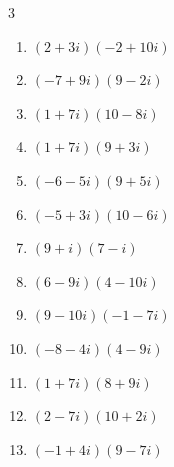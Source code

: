 \begin{multicols}{3}
\begin{enumerate}
        \phantom{$\displaystyle =-32-24i$}

  \item $\displaystyle (2+3i)(-2+10i)$

        \phantom{$\displaystyle =-34+14i$}

  \item $\displaystyle (-7+9i)(9-2i)$

        \phantom{$\displaystyle =-45+95i$}

  \item $\displaystyle (1+7i)(10-8i)$

        \phantom{$\displaystyle =66+62i$}

\columnbreak %

  \item $\displaystyle (1+7i)(9+3i)$

        \phantom{$\displaystyle =-12+66i$}

  \item $\displaystyle (-6-5i)(9+5i)$

        \phantom{$\displaystyle =-29-75i$}

  \item $\displaystyle (-5+3i)(10-6i)$

        \phantom{$\displaystyle =-32+60i$}

  \item $\displaystyle (9+i)(7-i)$

        \phantom{$\displaystyle =64-2i$}

  \item $\displaystyle (6-9i)(4-10i)$

        \phantom{$\displaystyle =-66-96i$}

  \item $\displaystyle (9-10i)(-1-7i)$

        \phantom{$\displaystyle =-79-53i$}

  \item $\displaystyle (-8-4i)(4-9i)$

        \phantom{$\displaystyle =-68+56i$}

  \item $\displaystyle (1+7i)(8+9i)$

        \phantom{$\displaystyle =-55+65i$}

  \item $\displaystyle (2-7i)(10+2i)$

        \phantom{$\displaystyle =34-66i$}

  \item $\displaystyle (-1+4i)(9-7i)$


\end{enumerate}
\end{multicols}
